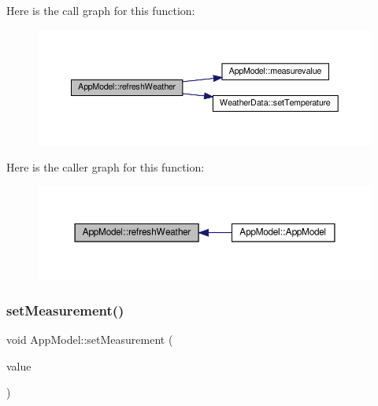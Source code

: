 Here is the call graph for this function\+:\nopagebreak
\begin{figure}[H]
\begin{center}
\leavevmode
\includegraphics[width=350pt]{class_app_model_a37e1da9d028779f7f0fc908e4c04fa76_cgraph}
\end{center}
\end{figure}
Here is the caller graph for this function\+:\nopagebreak
\begin{figure}[H]
\begin{center}
\leavevmode
\includegraphics[width=350pt]{class_app_model_a37e1da9d028779f7f0fc908e4c04fa76_icgraph}
\end{center}
\end{figure}
\mbox{\label{class_app_model_af8e28b32ab4d33c6f10bcab5d9c5b25c}} 
\subsubsection{\texorpdfstring{set\+Measurement()}{setMeasurement()}}
{\footnotesize\ttfamily void App\+Model\+::set\+Measurement (\begin{DoxyParamCaption}\item[{const Metrics\+Average \&}]{value }\end{DoxyParamCaption})}

\mbox{\label{class_app_model_ad78b2a410448a33eb9913cebfa64d32d}} 
